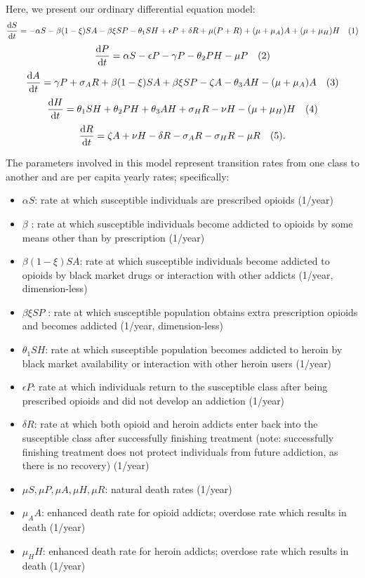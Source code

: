 \documentclass[12pt]{article}
\begin{document}
Here, we present our ordinary differential equation model: 
\[\dv{S}{t} = -\alpha S - \beta (1- \xi) SA  -\beta \xi SP- \theta_{1} SH +\epsilon P +\delta R +\mu (P+R) + (\mu+\mu_{A})A + (\mu+\mu_{H}) H \quad (1)\] 
\[\dv{P}{t} = \alpha S - \epsilon P  - \gamma P - \theta_{2}PH- \mu P    \quad(2)\]
\[\dv{A}{t} = \gamma P + \sigma_{A} R +\beta (1- \xi) SA  +\beta \xi SP -\zeta A - \theta_{3}AH-(\mu + \mu_{A})A   \quad (3)\]
\[\dv{H}{t} = \theta_{1}SH+\theta_{2}PH+\theta_{3}AH + \sigma_{H}R-\nu H-(\mu+\mu_{H})H  \quad (4)\]
\[\dv{R}{t} = \zeta A +\nu H -\delta R -\sigma_{A}R-\sigma_{H}R -\mu R\quad(5).\]


The parameters involved in this model represent transition rates from one class to another and are per capita yearly rates; specifically: 
\begin{itemize}
\item $\alpha S$: rate at which susceptible individuals are prescribed opioids (1/year)
\item $\beta$ : rate at which susceptible individuals become addicted to opioids by some means other than by prescription (1/year)
\item $\beta(1-\xi) SA$: rate at which susceptible individuals become addicted to opioids by black market drugs or interaction with other addicts (1/year, dimension-less)
\item $\beta \xi SP$ : rate at which susceptible population obtains extra prescription opioids and becomes addicted  (1/year, dimension-less)
\item $\theta_1 SH$: rate at which susceptible population becomes addicted to heroin by black market availability or interaction with other heroin users  (1/year)
\item $\epsilon P$: rate at which individuals return to the susceptible class after being prescribed opioids and did not develop an addiction (1/year) 
\item $\delta R$: rate at which both opioid and heroin addicts enter back into the susceptible class after successfully finishing treatment (note: successfully finishing treatment does not protect individuals from future addiction, as there is no recovery) (1/year) 
\item $\mu S, \mu P, \mu A, \mu H, \mu R$: natural death rates (1/year)
\item $\mu_A A$: enhanced death rate for opioid addicts; overdose rate which results in death (1/year)
\item $\mu_H H$: enhanced death rate for heroin addicts; overdose rate which results in death (1/year)

\end{itemize}
\end{document}
